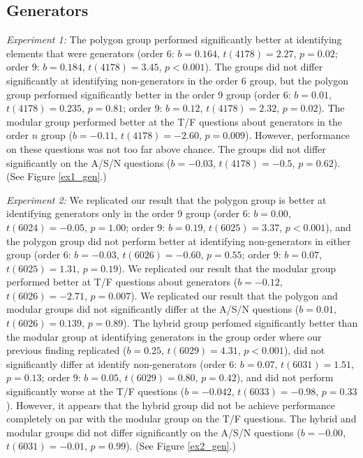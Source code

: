 \documentclass[man,10pt]{apa6}
\begin{document}
\subsection{Generators}
\textit{Experiment 1:} The polygon group performed significantly better at identifying elements that were generators (order 6: $b = 0.164$, $t(4178) = 2.27$, $p = 0.02$; order 9: $b = 0.184$, $t(4178) = 3.45$, $p < 0.001$). The groups did not differ significantly at identifying non-generators in the order 6 group, but the polygon group performed significantly better in the order 9 group (order 6: $b = 0.01$, $t(4178) = 0.235$, $p = 0.81$; order 9: $b = 0.12$, $t(4178) = 2.32$, $p = 0.02$). The modular group performed better at the T/F questions about generators in the order $n$ group ($b = -0.11$, $t(4178) = -2.60$, $p = 0.009$). However, performance on these questions was not too far above chance. The groups did not differ significantly on the A/S/N questions ($b = -0.03$, $t(4178) = -0.5$, $p = 0.62$). (See Figure \ref{ex1_gen}.)\par
\textit{Experiment 2:} We replicated our result that the polygon group is better at identifying generators only in the order 9 group (order 6: $b = 0.00$, $t(6024) = -0.05$, $p = 1.00$; order 9: $b = 0.19$, $t(6025) = 3.37$, $p < 0.001$), and the polygon group did not perform better at identifying non-generators in either group (order 6: $b = -0.03$, $t(6026) = -0.60$, $p = 0.55$; order 9: $b = 0.07$, $t(6025) = 1.31$, $p = 0.19$). We replicated our result that the modular group performed better at T/F questions about generators ($b = -0.12$, $t(6026) = -2.71$, $p = 0.007$). We replicated our result that the polygon and modular groups did not significantly differ at the A/S/N questions ($b =  0.01$, $t(6026) = 0.139$, $p = 0.89$). The hybrid group perfomed significantly better than the modular group at identifying generators in the group order where our previous finding replicated ($b = 0.25$, $t(6029) = 4.31$, $p < 0.001$), did not significantly differ at identify non-generators (order 6: $b = 0.07$, $t(6031) = 1.51$, $p = 0.13$; order 9: $b = 0.05$, $t(6029) = 0.80$, $p = 0.42$), and did not perform significantly worse at the T/F questions ($b = -0.042$, $t(6033) = -0.98$, $p = 0.33$). However, it appears that the hybrid group did not be achieve performance completely on par with the modular group on the T/F questions. The hybrid and modular groups did not differ significantly on the A/S/N questions ($b = -0.00$, $t(6031) = -0.01$, $p = 0.99$). (See Figure \ref{ex2_gen}.) \par
\end{document}
